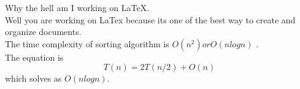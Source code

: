 \documentclass[11pt]{article}
\begin{document}
Why the hell am I working on LaTeX.\\
Well you are working on LaTex because its one of the best way to create and organize documents.\\
The time complexity  of sorting algorithm is $O(n^2) or O(nlogn)$ .\\
The equation is $$T(n)=2T(n/2)+O(n)$$
which solves as $O(nlogn)$.
\end{document}
